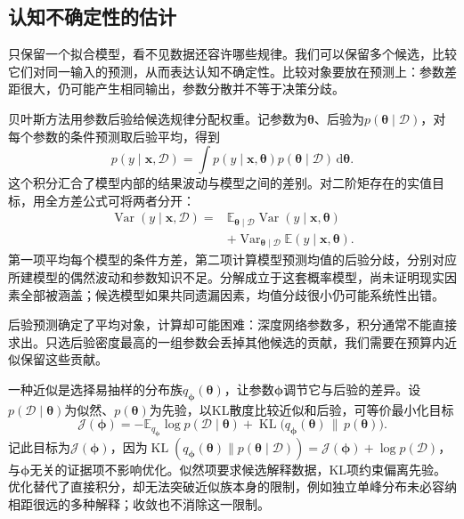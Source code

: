 \subsection{认知不确定性的估计}
\label{sec:reliability-epistemic-estimation}

只保留一个拟合模型，看不见数据还容许哪些规律。我们可以保留多个候选，比较它们对同一输入的预测，从而表达认知不确定性。比较对象要放在预测上：参数差距很大，仍可能产生相同输出，参数分散并不等于决策分歧。

贝叶斯方法用参数后验给候选规律分配权重。记参数为$\bm{\theta}$、后验为$p(\bm{\theta}\mid\mathcal D)$，对每个参数的条件预测取后验平均，得到
\begin{equation}
 p(y\mid\bm{x},\mathcal D)
 =\int p(y\mid\bm{x},\bm{\theta})
       p(\bm{\theta}\mid\mathcal D)\,\mathrm d\bm{\theta}.
 \label{eq:reliability-posterior-predictive}
\end{equation}
这个积分汇合了模型内部的结果波动与模型之间的差别。对二阶矩存在的实值目标，用全方差公式可将两者分开：
\begin{equation}
 \begin{aligned}
 \operatorname{Var}(y\mid\bm{x},\mathcal D)
 ={}&\mathbb E_{\bm{\theta}\mid\mathcal D}
       \operatorname{Var}(y\mid\bm{x},\bm{\theta})\\
 &+\operatorname{Var}_{\bm{\theta}\mid\mathcal D}
       \mathbb E(y\mid\bm{x},\bm{\theta}).
 \end{aligned}
 \label{eq:reliability-variance-decomposition}
\end{equation}
第一项平均每个模型的条件方差，第二项计算模型预测均值的后验分歧，分别对应所建模型的偶然波动和参数知识不足。分解成立于这套概率模型，尚未证明现实因素全部被涵盖；候选模型如果共同遗漏因素，均值分歧很小仍可能系统性出错。

后验预测确定了平均对象，计算却可能困难：深度网络参数多，积分通常不能直接求出。只选后验密度最高的一组参数会丢掉其他候选的贡献，我们需要在预算内近似保留这些贡献。

一种近似是选择易抽样的分布族$q_{\bm{\phi}}(\bm{\theta})$，让参数$\bm{\phi}$调节它与后验的差异。设$p(\mathcal D\mid\bm{\theta})$为似然、$p(\bm{\theta})$为先验，以KL散度比较近似和后验，可等价最小化目标
\begin{equation}
 \mathcal J(\bm{\phi})
 =-\mathbb E_{q_{\bm{\phi}}}\log p(\mathcal D\mid\bm{\theta})
   +\operatorname{KL}\bigl(q_{\bm{\phi}}(\bm{\theta})
                    \,\|\,p(\bm{\theta})\bigr).
 \label{eq:reliability-variational-objective}
\end{equation}
记此目标为$\mathcal J(\bm{\phi})$，因为$\operatorname{KL}(q_{\bm{\phi}}(\bm{\theta})\|p(\bm{\theta}\mid\mathcal D))=\mathcal J(\bm{\phi})+\log p(\mathcal D)$，与$\bm{\phi}$无关的证据项不影响优化。似然项要求候选解释数据，KL项约束偏离先验。优化替代了直接积分，却无法突破近似族本身的限制，例如独立单峰分布未必容纳相距很远的多种解释；收敛也不消除这一限制。

